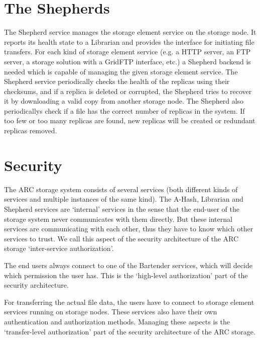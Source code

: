\documentclass{book}
\begin{document}

\section{The Shepherds} %
\label{sec:the_shepherds}

The Shepherd service manages the storage element service on the storage node. It reports its health state to a Librarian and provides the interface for initiating file transfers. For each kind of storage element service (e.g. a HTTP server, an FTP server, a storage solution with a GridFTP interface, etc.) a Shepherd backend is needed which is capable of managing the given storage element service. The Shepherd service periodically checks the health of the replicas using their checksums, and if a replica is deleted or corrupted, the Shepherd tries to recover it by downloading a valid copy from another storage node. The Shepherd also periodicallys check if a file has the correct number of replicas in the system. If too few or too many replicas are found, new replicas will be created or redundant replicas removed.


\section{Security} %
\label{sec:security}

The ARC storage system consists of several services (both different kinds of services and multiple instances of the same kind). The A-Hash, Librarian and Shepherd services are `internal' services in the sense that the end-user of the storage system never communicates with them directly. But these internal services are communicating with each other, thus they have to know which other services to trust. We call this aspect of the security architecture of the ARC storage `inter-service authorization'.

The end users always connect to one of the Bartender services, which will decide which permission the user has. This is the `high-level authorization' part of the security architecture.

For transferring the actual file data, the users have to connect to storage element services running on storage nodes. These services also have their own authentication and authorization methods. Managing these aspects is the `transfer-level authorization' part of the security architecture of the ARC storage.
\end{document}
